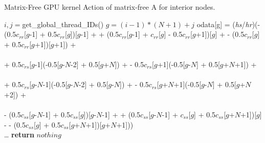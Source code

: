 \begin{algorithm*}
\caption{Matrix-Free GPU kernel Action of matrix-free A for interior nodes.}\label{alg:mfA-1}
\algrenewcommand{}
\begin{algorithmic}
    \State  $i, j = $get\_global\_thread\_IDs()
    \State $g = (i-1) * (N+1) + j$
     
        \State odata[g] = (\emph{hs}/\emph{hr})(- (0.5$c_{rr}$[$g$-1] + 0.5$c_{rr}$[$g$])[$g$-1] +
        \State \hspace{25mm}    + (0.5$c_{rr}$[$g$-1]  +  $c_{rr}$[$g$] - 0.5$c_{rr}$[$g$+1])[$g$] + 
        \State  \hspace{25mm}     - (0.5$c_{rr}$[$g$] + 0.5$c_{rr}$[$g$+1])[$g$+1]) + \\ \\
        \State \hspace{25mm} + 0.5$c_{rs}$[$g$-1](-0.5[$g$-$N$-2] + 0.5[$g$+$N$]) + 
        \State   \hspace{25mm} - 0.5$c_{rs}$[$g$+1](-0.5[$g$-$N$] + 0.5[$g$+$N$+1]) + \\ \\
        \State  \hspace{25mm} + 0.5$c_{rs}$[$g$-$N$-1](-0.5[$g$-$N$-2] + 0.5[$g$-$N$]) + 
        \State  \hspace{25mm} - 0.5$c_{rs}$[$g$+$N$+1](-0.5[$g$-$N$] + 0.5[$g$+$N$+2]) + \\ \\
        \State  \hspace{25mm} - (0.5$c_{ss}$[$g$-$N$-1] + 0.5$c_{ss}$[$g$])[$g$-$N$-1] + 
        \State  \hspace{25mm} + (0.5$c_{ss}$[$g$-$N$-1]  + $c_{ss}$[$g$] + 0.5$c_{ss}$[$g$+$N$+1])[$g$] - 
        \State  \hspace{25mm}     - (0.5$c_{ss}$[$g$] + 0.5$c_{ss}$[$g$+$N$+1])[$g$+$N$+1])) \\
    \EndIf
    \State  \dots {}
    \State \textbf{return} $nothing $ 
\EndProcedure
\end{algorithmic}
\end{algorithm*}


